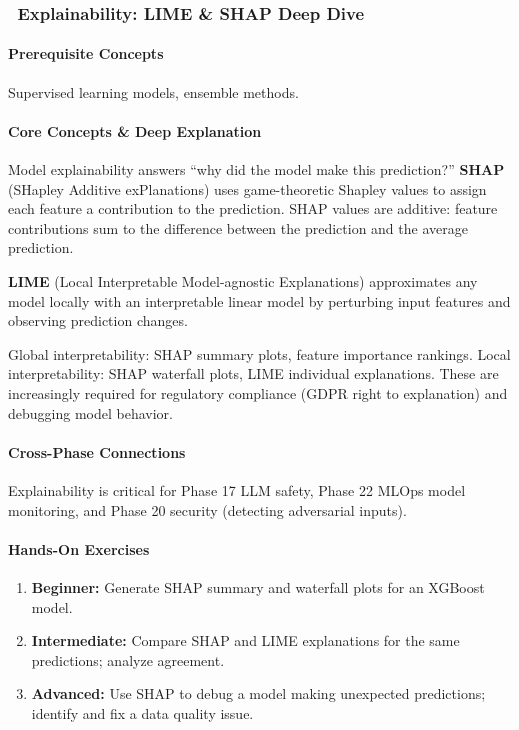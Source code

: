 \documentclass[11pt, a4paper, oneside]{report}
\newcommand{\mustmaster}[1]{\subsubsection{\texorpdfstring{\fcolorbox{blue!40!black}{blue!8}{\footnotesize\bfseries\color{blue!40!black} MUST MASTER}~#1}{#1}}}
\begin{document}
\mustmaster{Explainability: LIME \& SHAP Deep Dive}

\paragraph{Prerequisite Concepts} Supervised learning models, ensemble methods.

\paragraph{Core Concepts \& Deep Explanation} Model explainability answers ``why did the model make this prediction?'' \textbf{SHAP} (SHapley Additive exPlanations) uses game-theoretic Shapley values to assign each feature a contribution to the prediction. SHAP values are additive: feature contributions sum to the difference between the prediction and the average prediction.

\textbf{LIME} (Local Interpretable Model-agnostic Explanations) approximates any model locally with an interpretable linear model by perturbing input features and observing prediction changes.

Global interpretability: SHAP summary plots, feature importance rankings. Local interpretability: SHAP waterfall plots, LIME individual explanations. These are increasingly required for regulatory compliance (GDPR right to explanation) and debugging model behavior.

\paragraph{Cross-Phase Connections} Explainability is critical for Phase 17 LLM safety, Phase 22 MLOps model monitoring, and Phase 20 security (detecting adversarial inputs).

\paragraph{Hands-On Exercises}
\begin{enumerate}[leftmargin=*]
\item \textbf{Beginner:} Generate SHAP summary and waterfall plots for an XGBoost model.
\item \textbf{Intermediate:} Compare SHAP and LIME explanations for the same predictions; analyze agreement.
\item \textbf{Advanced:} Use SHAP to debug a model making unexpected predictions; identify and fix a data quality issue.
\end{enumerate}
\end{document}
